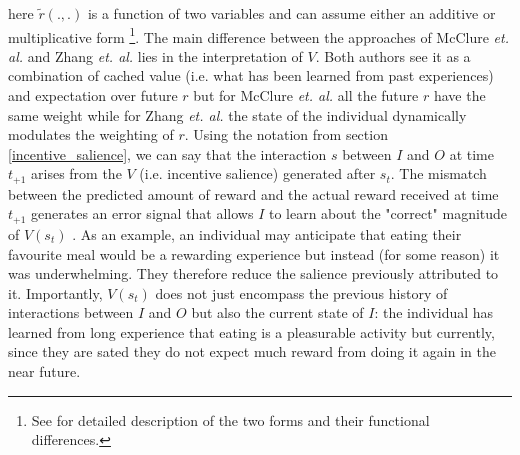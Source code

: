 here $\tilde{r}(.,.)$ is a function of two variables and can assume either an additive or multiplicative form \footnote{See \cite{zhang2009neural} for detailed description of the two forms and their functional differences.}. The main difference between the approaches of McClure \textit{et. al.} and Zhang \textit{et. al.} lies in the interpretation of $V$. Both authors see it as a combination of cached value (i.e. what has been learned from past experiences) and expectation over future $r$ but for McClure \textit{et. al.} all the future $r$ have the same weight while for Zhang \textit{et. al.} the state of the individual dynamically modulates the weighting of $r$. Using the notation from section \ref{incentive_salience}, we can say that the interaction $s$ between $I$ and $O$ at time $t_{+1}$ arises from the $V$ (i.e. incentive salience) generated after $s_{t}$. The mismatch between the predicted amount of reward and the actual reward received at time $t_{+1}$ generates an error signal that allows $I$ to learn about the "correct" magnitude of $V(s_{t})$ \cite{schultz2017reward} . As an example, an individual may anticipate that eating their favourite meal would be a rewarding experience but instead (for some reason) it was underwhelming. They therefore reduce the salience previously attributed to it. Importantly, $V(s_{t})$ does not just encompass the previous history of interactions between $I$ and $O$ but also the current state of $I$: the individual has learned from long experience that eating is a pleasurable activity but currently, since they are sated they do not expect much reward from doing it again in the near future.  

